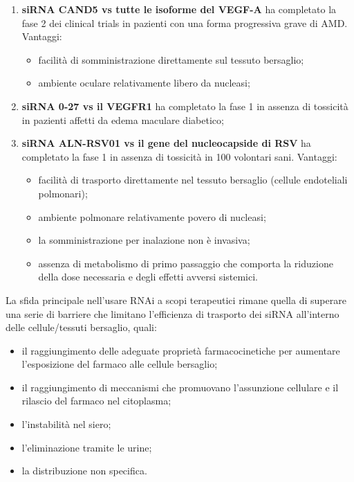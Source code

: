 \documentclass[]{article}
\begin{document}
\begin{enumerate}
\def\labelenumi{\arabic{enumi}.}
\item
  \textbf{siRNA CAND5 vs tutte le isoforme del VEGF-A} ha completato la
  fase 2 dei clinical trials in pazienti con una forma progressiva grave
  di AMD. Vantaggi:

  \begin{itemize}
  \itemsep1pt\parskip0pt
  \item
    facilità di somministrazione direttamente sul tessuto bersaglio;
  \item
    ambiente oculare relativamente libero da nucleasi;
  \end{itemize}
\item
  \textbf{siRNA 0-27 vs il VEGFR1} ha completato la fase 1 in assenza di
  tossicità in pazienti affetti da edema maculare diabetico;
\item
  \textbf{siRNA ALN-RSV01 vs il gene del nucleocapside di RSV} ha
  completato la fase 1 in assenza di tossicità in 100 volontari sani.
  Vantaggi:

  \begin{itemize}
  \itemsep1pt\parskip0pt
  \item
    facilità di trasporto direttamente nel tessuto bersaglio (cellule
    endoteliali polmonari);
  \item
    ambiente polmonare relativamente povero di nucleasi;
  \item
    la somministrazione per inalazione non è invasiva;
  \item
    assenza di metabolismo di primo passaggio che comporta la riduzione
    della dose necessaria e degli effetti avversi sistemici.
  \end{itemize}
\end{enumerate}

La sfida principale nell'usare RNAi a scopi terapeutici rimane quella di
superare una serie di barriere che limitano l'efficienza di trasporto
dei siRNA all'interno delle cellule/tessuti bersaglio, quali:

\begin{itemize}
\itemsep1pt\parskip0pt
\item
  il raggiungimento delle adeguate proprietà farmacocinetiche per
  aumentare l'esposizione del farmaco alle cellule bersaglio;
\item
  il raggiungimento di meccanismi che promuovano l'assunzione cellulare
  e il rilascio del farmaco nel citoplasma;
\item
  l'instabilità nel siero;
\item
  l'eliminazione tramite le urine;
\item
  la distribuzione non specifica.
\end{itemize}
\end{document}
